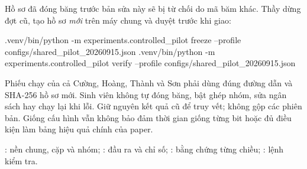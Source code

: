 \documentclass[11pt,a4paper]{article}
\newcommand{\heading}[1]{\par\vspace{4pt}{\large\bfseries #1}\par}
\begin{document}
\heading{6. Không dùng hồ sơ cấu hình cũ sau khi sửa mã}
Hồ sơ đã đóng băng trước bản sửa này sẽ bị từ chối do mã băm khác.
Thầy dừng đợt cũ, tạo hồ sơ \emph{mới} trên máy chung và duyệt trước khi giao:
\begin{cmd}
.venv/bin/python -m experiments.controlled_pilot freeze --profile configs/shared_pilot_20260915.json
.venv/bin/python -m experiments.controlled_pilot verify --profile configs/shared_pilot_20260915.json
\end{cmd}
Phiếu chạy của cả Cường, Hoàng, Thành và Sơn phải dùng đúng đường dẫn và
SHA-256 hồ sơ mới. Sinh viên không tự đóng băng, bật ghép nhóm, sửa ngân sách
hay chạy lại khi lỗi. Giữ nguyên kết quả cũ để truy vết; không gộp các phiên bản.
Giống cấu hình vẫn không bảo đảm thời gian giống từng bit hoặc đủ điều kiện làm
bảng hiệu quả chính của paper.

\heading{7. Nơi xem mã}
: nền chung, cặp và nhóm;
: đầu ra và chỉ số;
: bằng chứng từng chiều;
: lệnh kiểm tra.
\end{document}
